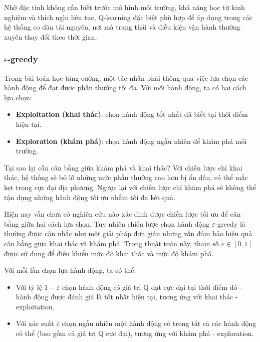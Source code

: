 Nhờ đặc tính không cần biết trước mô hình môi trường, khả năng học từ kinh nghiệm và thích nghi liên tục, Q-learning đặc biệt phù hợp để áp dụng trong các hệ thống co dãn tài nguyên, nơi mà trạng thái và điều kiện vận hành thường xuyên thay đổi theo thời gian.

\subsubsection{$\epsilon$-greedy}

Trong bài toán học tăng cường, một tác nhân phải thông qua việc lựa chọn các hành động để đạt được phần thưởng tối đa. Với mỗi hành động, ta có hai cách lựa chọn:

\begin{itemize}
    \item \textbf{Exploitation (khai thác)}: chọn hành động tốt nhất đã biết tại thời điểm hiện tại.
    \item \textbf{Exploration (khám phá)}: chọn hành động ngẫu nhiên để khám phá môi trường.
\end{itemize}

Tại sao lại cần cân bằng giữa khám phá và khai thác? Với chiến lược chỉ khai thác, hệ thống sẽ bỏ lỡ những mức phần thưởng cao hơn bị ẩn dấu, có thể mắc kẹt trong cực đại địa phương. Ngược lại với chiến lược chỉ khám phá sẽ không thể tận dụng những hành động tối ưu nhằm tối đa kết quả.

Hiện nay vẫn chưa có nghiên cứu nào xác định được chiến lược tối ưu để cân bằng giữa hai cách lựa chọn. Tuy nhiên chiến lược chọn hành động $\varepsilon$-greedy là thường được cân nhắc như một giải pháp đơn giản nhưng vẫn đảm bảo hiệu quả cân bằng giữa khai thác và khám phá. Trong thuật toán này, tham số $\varepsilon \in [0, 1]$ được sử dụng để điều khiển mức độ khai thác và mức độ khám phá.

Với mỗi lần chọn lựa hành động, ta có thể:

\begin{itemize}
    \item Với tỷ lệ $1 - \varepsilon$ chọn hành động có giá trị Q đạt cực đại tại thời điểm đó - hành động được đánh giá là tốt nhất hiện tại, tương ứng với khai thác - exploitation.
    \item Với xác suất $\varepsilon$ chọn ngẫu nhiên một hành động có trong tất cả các hành động có thể (bao gồm cả giá trị Q cực đại), tương ứng với khám phá - exploration.
\end{itemize}

